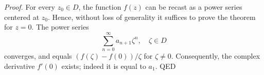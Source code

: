 \documentclass[12pt]{article}
\begin{document}
\emph{Proof.} For every $z_0\in D$, the function $f(z)$ can be recast
as a power series centered at $z_0$.  Hence, without loss of
generality it suffices to prove the theorem for $z=0$.  The power
series
$$\sum_{n=0}^\infty a_{n+1} \zeta^n,\quad \zeta\in D$$
converges, and equals
$(f(\zeta)-f(0))/\zeta$ for $\zeta\neq 0$. Consequently, the complex
derivative $f'(0)$ exists; indeed it is equal to $a_1$.  QED
\end{document}
